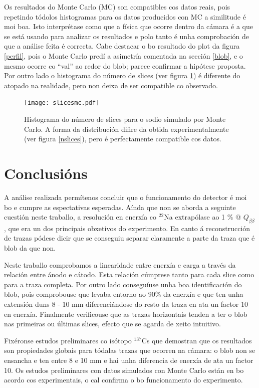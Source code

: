 \documentclass[a4paper,12pt]{article}
\begin{document}
Os resultados do Monte Carlo (MC) son compatibles cos datos reais, pois repetindo tódolos histogramas para os datos producidos con MC a similitude é moi boa. Isto interprétase como que a física que ocorre dentro da cámara é a que se está usando para analizar os resultados e polo tanto é unha comprobación de que a análise feita é correcta. Cabe destacar o bo resultado do plot da figura \ref{perfil}, pois o Monte Carlo predí a asimetría comentada na sección \ref{blob}, e o mesmo ocorre co ``val'' ao redor do blob; parece confirmar a hipótese proposta. Por outro lado o histograma do número de slices (ver figura \ref{slicesmc}) é diferente do atopado na realidade, pero non deixa de ser compatible co observado.

\begin{figure}[!]
\centering
\texttt{[image: slicesmc.pdf]}
\caption{Histograma do número de slices para o sodio simulado por Monte Carlo. A forma da distribución difire da obtida experimentalmente (ver figura \ref{nslices}), pero é perfectamente compatible cos datos.}
\label{slicesmc}
\end{figure}

\section{Conclusións}\label{conclusions}

A análise realizada permítenos concluir que o funcionamento do detector é moi bo e cumpre as espectativas esperadas. Aínda que non se aborda a seguinte cuestión neste traballo, a resolución en enerxía co $^{22}$Na extrapólase ao 1 \% @ $Q_{\beta\beta}$, que era un dos principais obxetivos do experimento. En canto á reconstrucción de trazas pódese dicir que se conseguiu separar claramente a parte da traza que é blob da que non.

Neste traballo comprobamos a linearidade entre enerxía e carga a través da relación entre ánodo e cátodo. Esta relación cúmprese tanto para cada slice como para a traza completa. Por outro lado conseguíuse unha boa identificación do blob, pois comprobouse que levaba entorno ao 90\% da enerxía e que ten unha extensión duns 8 - 10 mm diferenciándose do resto da traza en ata un factor 10 en enerxía. Finalmente verificouse que as trazas horizontais tenden a ter o blob nas primeiras ou últimas slices, efecto que se agarda de xeito intuitivo.

Fixéronse estudos preliminares co isótopo $^{137}$Cs que demostran que os resultados son propiedades globais para tódalas trazas que ocorren na cámara: o blob non se ensancha e ten entre 8 e 10 mm e hai unha diferencia de enerxía de ata un factor 10. Os estudos preliminares con datos simulados con Monte Carlo están en bo acordo cos experimentais, o cal confirma o bo funcionamento do experimento.
\end{document}
